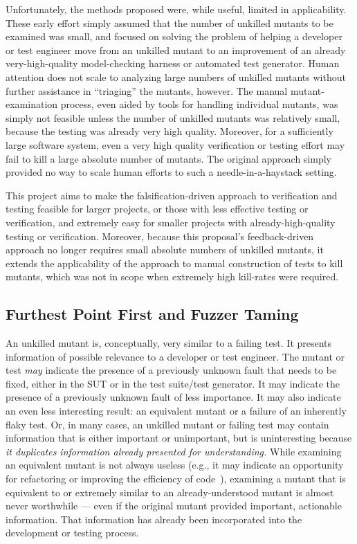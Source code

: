 Unfortunately, the
methods proposed were, while useful, limited in applicability.  These
early effort simply assumed that the number of unkilled mutants to be examined was
small, and focused on solving the problem of helping a developer or
test engineer move from an unkilled mutant to an improvement of an
already very-high-quality
model-checking harness or  automated test generator.  Human
attention does not scale to analyzing large numbers of 
unkilled
mutants without further assistance in ``triaging'' the mutants,
however.  The manual mutant-examination process, even aided by
tools for handling individual mutants, was simply not feasible unless the number of
unkilled mutants was relatively small, because the testing was already
very high quality.  Moreover, for a sufficiently large software system, even a
very high quality verification or testing effort may fail to kill a
large absolute number of mutants.  The original approach simply provided no way to
scale human efforts to such a needle-in-a-haystack setting. 

This project aims to make the falsification-driven approach to verification and testing feasible for larger
projects, or those with less effective testing or verification, and extremely easy for
smaller projects with already-high-quality testing or verification.
Moreover, because this proposal's feedback-driven approach no longer requires small absolute numbers of
unkilled mutants, it extends the applicability of the approach
to manual construction of tests to kill mutants, which was not in
scope when extremely high kill-rates were required.

\subsection{Furthest Point First and Fuzzer Taming}

An unkilled mutant is, conceptually, very similar to a failing test.
It presents information of possible relevance to a developer or test
engineer.  The mutant or test \emph{may} indicate the presence of a
previously unknown fault that needs to be fixed, either in the SUT or in the test suite/test
generator.  It may indicate the presence of a previously unknown fault
of less importance.  It may also indicate an even less interesting
result:  an equivalent mutant or 
a failure of an inherently flaky test.  Or, in many cases, an unkilled
mutant or failing test may contain information that is either
important or unimportant, but is uninteresting because \emph{it
  duplicates information already presented for understanding.}  While
examining an equivalent mutant is not always useless (e.g., it may indicate
an opportunity for refactoring or improving the efficiency of code~\cite{ivankovic2018industrial,groce2018verified}), examining a mutant that is
equivalent to or extremely similar to an already-understood mutant is almost never
worthwhile --- even if the original mutant provided important,
actionable information.  That information has already been
incorporated into the development or testing process.

